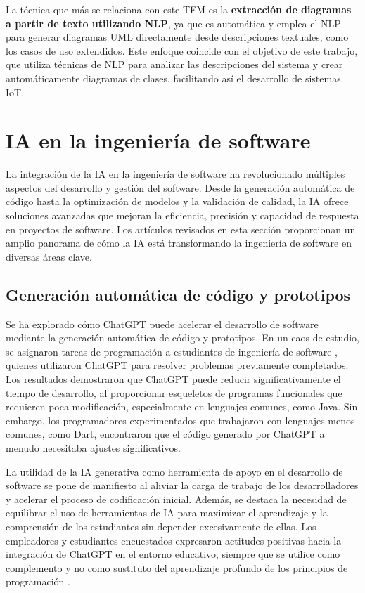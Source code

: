 La técnica que más se relaciona con este TFM es la \textbf{extracción de diagramas a partir de texto utilizando NLP}, ya que es automática y emplea el NLP para generar diagramas UML directamente desde descripciones textuales, como los casos de uso extendidos. Este enfoque coincide con el objetivo de este trabajo, que utiliza técnicas de NLP para analizar las descripciones del sistema y crear automáticamente diagramas de clases, facilitando así el desarrollo de sistemas IoT.




\section{IA en la ingeniería de software}

La integración de la IA en la ingeniería de software ha revolucionado múltiples aspectos del desarrollo y gestión del software. Desde la generación automática de código hasta la optimización de modelos y la validación de calidad, la IA ofrece soluciones avanzadas que mejoran la eficiencia, precisión y capacidad de respuesta en proyectos de software. Los artículos revisados en esta sección proporcionan un amplio panorama de cómo la IA está transformando la ingeniería de software en diversas áreas clave.

\subsection{Generación automática de código y prototipos}

Se ha explorado cómo ChatGPT puede acelerar el desarrollo de software mediante la generación automática de código y prototipos. En un caos de estudio, se asignaron tareas de programación a estudiantes de ingeniería de software \cite{Petrovska2023}, quienes utilizaron ChatGPT para resolver problemas previamente completados. Los resultados demostraron que ChatGPT puede reducir significativamente el tiempo de desarrollo, al proporcionar esqueletos de programas funcionales que requieren poca modificación, especialmente en lenguajes comunes, como Java. Sin embargo, los programadores experimentados que trabajaron con lenguajes menos comunes, como Dart, encontraron que el código generado por ChatGPT a menudo necesitaba ajustes significativos.

La utilidad de la IA generativa como herramienta de apoyo en el desarrollo de software se pone de manifiesto al aliviar la carga de trabajo de los desarrolladores y acelerar el proceso de codificación inicial. Además, se destaca la necesidad de equilibrar el uso de herramientas de IA para maximizar el aprendizaje y la comprensión de los estudiantes sin depender excesivamente de ellas. Los empleadores y estudiantes encuestados expresaron actitudes positivas hacia la integración de ChatGPT en el entorno educativo, siempre que se utilice como complemento y no como sustituto del aprendizaje profundo de los principios de programación \cite{Petrovska2023}.

